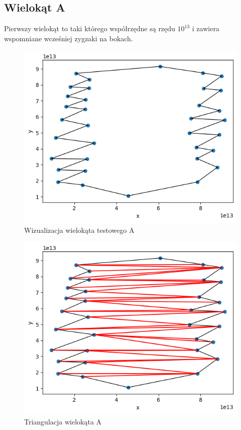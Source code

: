 \documentclass[a4paper]{article}
\begin{document}
    \subsection{Wielokąt A}
    Pierwszy wielokąt to taki którego współrzędne są rzędu $10^{13}$ i zawiera wspomniane wcześniej
    zygzaki na bokach. 
    \begin{figure}[H]
        \centering
        \includegraphics[width=.65\textwidth]{test_a_poly.png}
        \caption{Wizualizacja wielokąta testowego A}
        \label{fig:test_a_poly}
    \end{figure}
    \begin{figure}[H]
        \centering
        \includegraphics[width=.65\textwidth]{test_a_tri.png}
        \caption{Triangulacja wielokąta A}
        \label{fig:test_a_tri}
    \end{figure}
\end{document}
